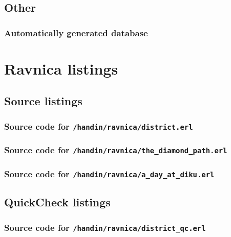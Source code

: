 \documentclass[12pt,a4paper]{article}
\begin{document}
\subsection{Other}
\subsubsection{Automatically generated database}\label{app:gendb}


\newpage
\section{Ravnica listings}
\subsection{Source listings}
\subsubsection{Source code for \texttt{/handin/ravnica/district.erl}}

\subsubsection{Source code for \texttt{/handin/ravnica/the\_diamond\_path.erl}}

\subsubsection{Source code for \texttt{/handin/ravnica/a\_day\_at\_diku.erl}}


\subsection{QuickCheck listings}
\subsubsection{Source code for \texttt{/handin/ravnica/district\_qc.erl}}

\end{document}
